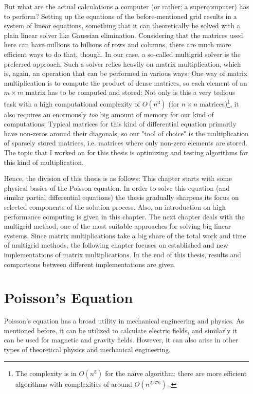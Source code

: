 But what are the actual calculations a computer (or rather: a supercomputer) has to perform? Setting up the equations of the before-mentioned grid results in a system of linear equations, something that it can theoretically be solved with a plain linear solver like Gaussian elimination. Considering that the matrices used here can have millions to billions of rows and columns, there are much more efficient ways to do that, though. In our case, a so-called multigrid solver is the preferred approach. Such a solver relies heavily on matrix multiplication, which is, again, an operation that can be performed in various ways: One way of matrix multiplication is to compute the product of dense matrices, so each element of an $m\times m$ matrix has to be computed and stored: Not only is this a very tedious task with a high computational complexity of $O(n^3)$ (for $n\times n$  matrices)\footnote{The complexity is in $O(n^3)$ for the naïve algorithm; there are more efficient algorithms with complexities of around $O(n^{2.376})$ \cite{COPPERSMITH1990251}.}, it also requires an enormously \textit{too} big amount of memory for our kind of computations: Typical matrices for  this kind of differential equation primarily have non-zeros around their diagonals, so our "tool of choice" is the multiplication of sparsely stored matrices, i.e. matrices where only non-zero elements are stored. The topic that I worked on for this thesis is optimizing and testing algorithms for this kind of multiplication.

Hence, the division of this thesis is as follows: This chapter starts with some physical basics of the Poisson equation. In order to solve this equation (and similar partial differential equations) the thesis gradually sharpens its focus on selected components of the solution process. Also, an introduction on high performance computing is given in this chapter. The next chapter deals with the multigrid method, one of the most suitable approaches for solving big linear systems. Since matrix multiplications take a big share of the total work and time of multigrid methods, the following chapter focuses on established and new implementations of matrix multiplications. In the end of this thesis, results and comparisons between different implementations are given. 


\section{Poisson's Equation}
Poisson's equation has a broad utility in mechanical engineering and physics. As mentioned before, it can be utilized to calculate electric fields, and similarly it can be used for magnetic and gravity fields. However, it can also arise in other types of theoretical physics and mechanical engineering. 

